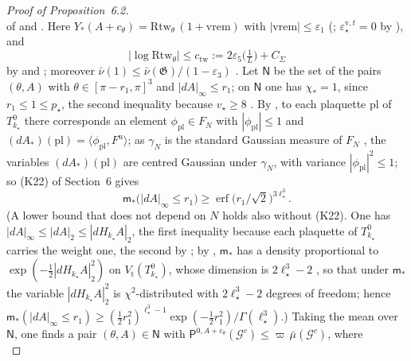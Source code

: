 \documentclass[11pt]{amsart}
\theoremstyle{definition}
\begin{document}
\begin{proof}[Proof of Proposition~6.2]
\begin{equation*}
\end{equation*}
of \cite[Section~G4.0.6]{QEDIII} and \cite[Definition~5.11]{QEDI}.
Here $Y_*(A+c_\theta)=\mathrm{Rtw}_\theta\,(1+\mathrm{vrem})$ with $|\mathrm{vrem}|\le\varepsilon_1$ (\cite[Proposition~32.1]{QEDIII}; $\varepsilon^{\mathrm v,t}_\star=0$ by \cite[Proposition~28.2]{QEDIII}), and
\begin{equation*}
|\log\mathrm{Rtw}_\theta|\le c_{\mathrm{tw}}:=2\varepsilon_5\bigl(\tfrac1L\bigr)+C_\Sigma
\end{equation*}
by \cite[Proposition~30.3\,(e)]{QEDIII} and \cite[Section~G4.0.2, (Sc3)]{QEDIII};
moreover $\bar\nu(1)\le\bar\nu(\mathfrak G)/(1-\varepsilon_3)$ \cite[Proposition~32.2\,(7.2)]{QEDIII}.
Let $\mathsf N$ be the set of the pairs $(\theta,A)$ with $\theta\in[\pi-r_1,\pi]^3$ and $|dA|_\infty\le r_1$;
on $\mathsf N$ one has $\chi_*=1$, since $r_1\le1\le p_\star$, the second inequality because $v_\star\ge8$ \cite[(fl)]{QEDIII}.
By \cite[Theorem~14.17\,(d)]{QEDI}, to each plaquette $\mathrm{pl}$ of $T^0_{k_\star}$ there corresponds an element $\phi_{\mathrm{pl}}\in F_N$ with $|\phi_{\mathrm{pl}}|\le1$ and $(dA_*)(\mathrm{pl})=\allowbreak \langle\phi_{\mathrm{pl}},\allowbreak F^{\mathrm u}\rangle$;
as $\gamma_N$ is the standard Gaussian measure of $F_N$ \cite[Section~I.7.3]{QEDIII}, the variables $(dA_*)(\mathrm{pl})$ are centred Gaussian under $\gamma_N$, with variance $|\phi_{\mathrm{pl}}|^2\le1$;
so (K22) of Section~6 gives
\begin{equation*}
\mathsf m_*\bigl(|dA|_\infty\le r_1\bigr)\ge\operatorname{erf}\bigl(r_1/\sqrt2\bigr)^{3\ell_\star^3}.
\end{equation*}
(A lower bound that does not depend on $N$ holds also without (K22).
One has $|dA|_\infty\le|dA|_2\le|dH_{k_\star}A|_2$, the first inequality because each plaquette of $T^0_{k_\star}$ carries the weight one, the second by \cite[Proposition~14.8\,(v)]{QEDI};
by \cite[Theorem~14.17\,(e)]{QEDI}, $\mathsf m_*$ has a density proportional to $\exp(-\frac12|dH_{k_\star}A|_2^2)$ on $V_{\mathrm t}(T^0_{k_\star})$, whose dimension is $2\ell_\star^3-2$ \cite[Section~14.1.1]{QEDI}, so that under $\mathsf m_*$ the variable $|dH_{k_\star}A|_2^2$ is $\chi^2$-distributed with $2\ell_\star^3-2$ degrees of freedom;
hence $\mathsf m_*(|dA|_\infty\le r_1)\ge(\frac12r_1^2)^{\ell_\star^3-1}\exp(-\frac12r_1^2)/\Gamma(\ell_\star^3)$.)
Taking the mean over $\mathsf N$, one finds a pair $(\theta,A)\in\mathsf N$ with $\mathsf P^{0,A+c_\theta}(\mathcal G^c)\le\varpi\,\allowbreak \bar\mu(\mathcal G^c)$, where
\begin{equation*}

\end{equation*}
\end{proof}
\end{document}
